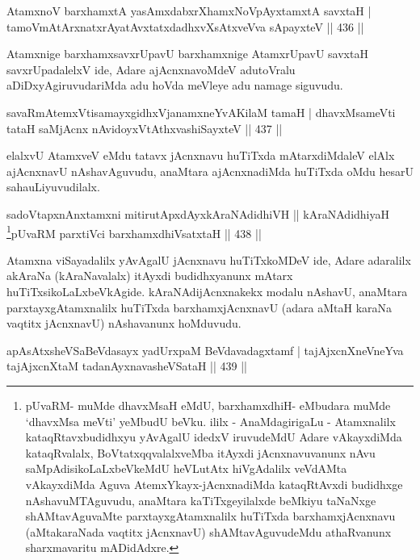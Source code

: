\begin{shl}
AtamxnoV barxhamxtA yasAmxdabxrXhamxNoV\s pAyxtamxtA savxtaH |
tamoVmAtArxnatxrAyatAvxtatxdadhxvXsAtxveVva sA\s \s payxteV \hfill || 436 ||
\end{shl}

\begin{artha}
Atamxnige barxhamxsavxrUpavU barxhamxnige AtamxrUpavU savxtaH savxrUpadalelxV ide, Adare ajAcnxnavoMdeV adutoVralu aDiDxyAgiruvudariMda adu hoVda meVleye adu namage siguvudu.
\end{artha}

\begin{shl}
savaRmAtemxVtisamayxgidhxVjanamxneYvAKilaM tamaH |
dhavxMsameVti tataH saMjAcnx nAvidoyxVtAthx\s vashiSayxteV \hfill || 437 ||
\end{shl}

\begin{artha}
elalxvU AtamxveV eMdu tatavx jAcnxnavu huTiTxda mAtarxdiMdaleV elAlx ajAcnxnavU nAshavAguvudu, anaMtara ajAcnxnadiMda huTiTxda oMdu hesarU saha\break uLiyuvudilalx.
\end{artha}

\begin{shl}
sadoVtapxnAnx\s \s tamxni mitirutApxdAyx\s kAraNAdidhiVH ||
kAraNAdidhiyaH \footnote{pUvaRM- muMde dhavxMsaH eMdU, barxhamxdhiH- eMbudara muMde `dhavxMsa meVti' yeMbudU beVku. ililx - AnaMdagirigaLu - Atamxnalilx kataqRtavxbudidhxyu yAvAgalU idedxV iruvudeMdU Adare vAkayxdiMda kataqRvalalx, BoVtatxqqvalalxveMba itAyxdi jAcnxnavuvanunx nAvu saMpAdisikoLaLxbeVkeMdU heVLutAtx hiVgAdalilx veVdAMta vAkayxdiMda Aguva AtemxYkayx-jAcnxnadiMda kataqRtAvxdi budidhxge nAshavuMTAguvudu, anaMtara kaTiTxgeyilalxde beMkiyu taNaNxge shAMtavAguvaMte parxtayxgAtamxnalilx huTiTxda barxhamxjAcnxnavu (aMtakaraNada vaqtitx jAcnxnavU) shAMtavAguvudeMdu athaRvanunx sharxmavaritu mADidAdxre.}pUvaRM parxtiVci barxhamxdhiVsatxtaH \hfill || 438 ||
\end{shl}


\begin{artha}
Atamxna viSayadalilx yAvAgalU jAcnxnavu huTiTxkoMDeV ide, Adare adaralilx akAraNa (kAraNavalalx) itAyxdi budidhxyanunx mAtarx huTiTxsikoLaLxbeVkAgide. kAraNAdijAcnxnakekx modalu nAshavU, anaMtara parxtayxgAtamxnalilx huTiTxda barxhamxjAcnxnavU (adara aMtaH karaNa vaqtitx jAcnxnavU) nAshavanunx hoMduvudu.
\end{artha}

\begin{shl}
apAsAtxsheVSaBeVdasayx yadUrxpaM BeVdavadagxtamf |
tajAjxcnXneVneYva tajAjxcnXtaM tadanAyxnavasheVSataH \hfill || 439 ||
\end{shl}

